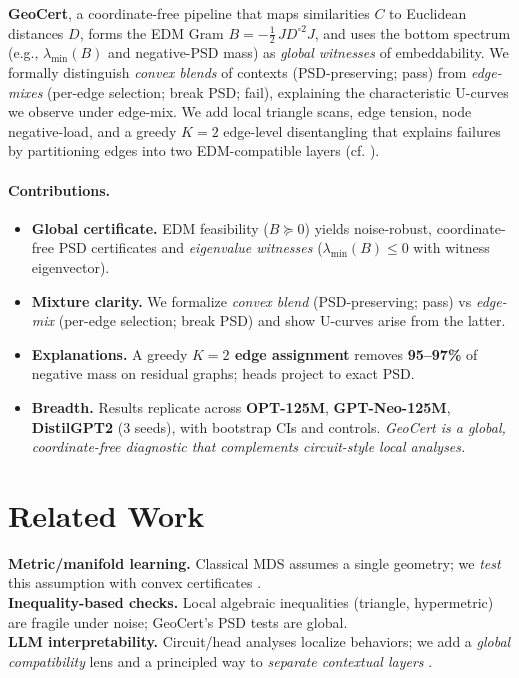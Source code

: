 \documentclass[11pt]{article}
\newcommand{\1}{\mathbf{1}}
\newcommand{\PSD}{\succeq 0}
\begin{document}
\noindent\textbf{GeoCert}, a coordinate-free pipeline that maps similarities $C$ to Euclidean distances $D$, forms the EDM Gram $B=-\tfrac12\,J D^{\circ2} J$, and uses the bottom spectrum (e.g., $\lambda_{\min}(B)$ and negative-PSD mass) as \emph{global witnesses} of embeddability. We formally distinguish \emph{convex blends} of contexts (PSD-preserving; pass) from \emph{edge-mixes} (per-edge selection; break PSD; fail), explaining the characteristic U-curves we observe under edge-mix. We add local triangle scans, edge tension, node negative-load, and a greedy $K{=}2$ edge-level disentangling that explains failures by partitioning edges into two EDM-compatible layers (cf. \citep{schoenberg1938,gower1985,LibertiLavor2017,Dokmanic2015}).

\paragraph{Contributions.}
\begin{itemize}[leftmargin=1.5em]
\item \textbf{Global certificate.} EDM feasibility ($B \PSD$) yields noise-robust, coordinate-free PSD certificates and \emph{eigenvalue witnesses} ($\lambda_{\min}(B)\le 0$ with witness eigenvector).
\item \textbf{Mixture clarity.} We formalize \emph{convex blend} (PSD-preserving; pass) vs \emph{edge-mix} (per-edge selection; break PSD) and show U-curves arise from the latter.
\item \textbf{Explanations.} A greedy \textbf{$K{=}2$ edge assignment} removes \textbf{95--97\%} of negative mass on residual graphs; heads project to exact PSD.
\item \textbf{Breadth.} Results replicate across \textbf{OPT-125M}, \textbf{GPT-Neo-125M}, \textbf{DistilGPT2} (3 seeds), with bootstrap CIs and controls. \emph{GeoCert is a global, coordinate-free diagnostic that complements circuit-style local analyses.}
\end{itemize}

\section{Related Work}
\textbf{Metric/manifold learning.} Classical MDS assumes a single geometry; we \emph{test} this assumption with convex certificates \citep{torgerson1952,borg2005}.\\
\textbf{Inequality-based checks.} Local algebraic inequalities (triangle, hypermetric) are fragile under noise; GeoCert’s PSD tests are global.\\
\textbf{LLM interpretability.} Circuit/head analyses localize behaviors; we add a \emph{global compatibility} lens and a principled way to \emph{separate contextual layers} \citep{Vig2020CausalMediation,Elazar2021Amnesic,Meng2022ROME}.
\end{document}
